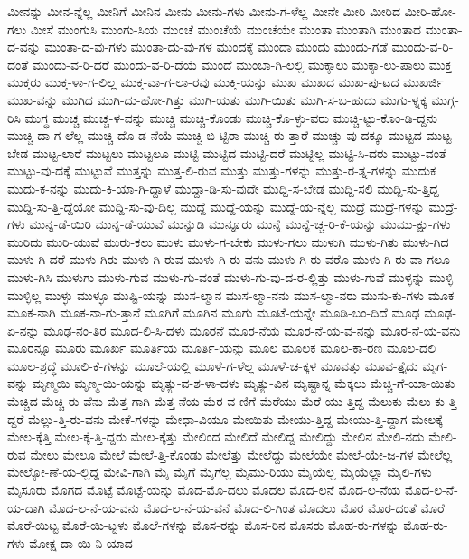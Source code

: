 {ಮೀನನ್ನು
ಮೀನ-ನ್ನೆಲ್ಲ
ಮೀನಿಗೆ
ಮೀನಿನ
ಮೀನು
ಮೀನು-ಗಳು
ಮೀನು-ಗ-ಳೆಲ್ಲ
ಮೀನೇ
ಮೀರಿ
ಮೀರಿದ
ಮೀರಿ-ಹೋ-ಗಲು
ಮೀಸೆ
ಮುಂಗುಸಿ
ಮುಂಗು-ಸಿಯ
ಮುಂಚೆ
ಮುಂಚೆಯೆ
ಮುಂಚೆಯೇ
ಮುಂತಾ
ಮುಂತಾಗಿ
ಮುಂತಾದ
ಮುಂತಾ-ದ-ವನ್ನು
ಮುಂತಾ-ದ-ವು-ಗಳು
ಮುಂತಾ-ದು-ವು-ಗಳ
ಮುಂದಕ್ಕೆ
ಮುಂದಾ
ಮುಂದು
ಮುಂದು-ಗಡೆ
ಮುಂದು-ವ-ರಿ-ದಂತೆ
ಮುಂದು-ವ-ರಿ-ದರೆ
ಮುಂದು-ವ-ರಿ-ದೆಯೆ
ಮುಂದೆ
ಮುಂಬಾ-ಗಿ-ಲಲ್ಲಿ
ಮುಕ್ಕಾಲು
ಮುಕ್ಕಾ-ಲು-ಪಾಲು
ಮುಕ್ತ
ಮುಕ್ತರು
ಮುಕ್ತ-ಳಾ-ಗ-ಲಿಲ್ಲ
ಮುಕ್ತ-ವಾ-ಗ-ಲಾ-ರವು
ಮುಕ್ತಿ-ಯನ್ನು
ಮುಖ
ಮುಖದ
ಮುಖ-ಪು-ಟದ
ಮುಖರ್ಜಿ
ಮುಖ-ವನ್ನು
ಮುಗಿದ
ಮುಗಿ-ದು-ಹೋ-ಗಿತ್ತು
ಮುಗಿ-ಯತು
ಮುಗಿ-ಯಿತು
ಮುಗಿ-ಸ-ಬ-ಹುದು
ಮುಗು-ಳ್ನಕ್ಕ
ಮುಗ್ಗ-ರಿಸಿ
ಮುಗ್ಧ
ಮುಚ್ಚ
ಮುಚ್ಚ-ಳ-ವನ್ನು
ಮುಚ್ಚಿ
ಮುಚ್ಚಿ-ಕೊಂಡು
ಮುಚ್ಚಿ-ಕೊ-ಳ್ಳು-ವರು
ಮುಚ್ಚಿ-ಟ್ಟು-ಕೊಂ-ಡಿ-ದ್ದನು
ಮುಚ್ಚಿ-ದಾ-ಗ-ಲೆಲ್ಲ
ಮುಚ್ಚಿ-ದೊ-ಡ-ನೆಯೆ
ಮುಚ್ಚಿ-ಬಿ-ಟ್ಟಿರಾ
ಮುಚ್ಚಿ-ರು-ತ್ತಾರೆ
ಮುಚ್ಚು-ವು-ದಕ್ಕೂ
ಮುಟ್ಟದ
ಮುಟ್ಟ-ಬೇಡ
ಮುಟ್ಟ-ಲಾರೆ
ಮುಟ್ಟಲು
ಮುಟ್ಟಲೂ
ಮುಟ್ಟಿ
ಮುಟ್ಟಿದ
ಮುಟ್ಟಿ-ದರೆ
ಮುಟ್ಟಿಲ್ಲ
ಮುಟ್ಟಿ-ಸಿ-ದರು
ಮುಟ್ಟು-ವಂತೆ
ಮುಟ್ಟು-ವು-ದಕ್ಕೆ
ಮುಟ್ಟುವೆ
ಮುತ್ತನ್ನು
ಮುತ್ತ-ಲಿ-ರುವ
ಮುತ್ತು
ಮುತ್ತು-ಗಳನ್ನು
ಮುತ್ತು-ರ-ತ್ನ-ಗಳನ್ನು
ಮುದುಕ
ಮುದು-ಕ-ನನ್ನು
ಮುದು-ಕಿ-ಯಾ-ಗಿ-ದ್ದಾಳೆ
ಮುದ್ದಾ-ಡಿ-ಸು-ವುದೇ
ಮುದ್ದಿ-ಸ-ಬೇಡ
ಮುದ್ದಿ-ಸಲಿ
ಮುದ್ದಿ-ಸು-ತ್ತಿದ್ದ
ಮುದ್ದಿ-ಸು-ತ್ತಿ-ದ್ದೆಯೋ
ಮುದ್ದಿ-ಸು-ವು-ದಿಲ್ಲ
ಮುದ್ದೆ
ಮುದ್ದೆ-ಯನ್ನು
ಮುದ್ದೆ-ಯ-ನ್ನೆಲ್ಲ
ಮುದ್ರೆ
ಮುದ್ರೆ-ಗಳನ್ನು
ಮುದ್ರೆ-ಗಳು
ಮುನ್ನ-ಡೆ-ಯಿರಿ
ಮುನ್ನ-ಡೆ-ಯುವೆ
ಮುನ್ನುಡಿ
ಮುನ್ನೂರು
ಮುನ್ನೆ
ಮುನ್ನೆ-ಚ್ಚ-ರಿ-ಕೆ-ಯನ್ನು
ಮುಮು-ಕ್ಷು-ಗಳು
ಮುರಿದು
ಮುರಿ-ಯುವೆ
ಮುರು-ಕಲು
ಮುಳು
ಮುಳು-ಗ-ಬೇಕು
ಮುಳು-ಗಲು
ಮುಳುಗಿ
ಮುಳು-ಗಿತು
ಮುಳು-ಗಿದ
ಮುಳು-ಗಿ-ದರೆ
ಮುಳು-ಗಿರು
ಮುಳು-ಗಿ-ರುವ
ಮುಳು-ಗಿ-ರು-ವನು
ಮುಳು-ಗಿ-ರು-ವರೊ
ಮುಳು-ಗಿ-ರು-ವಾ-ಗಲೂ
ಮುಳು-ಗಿಸಿ
ಮುಳುಗು
ಮುಳು-ಗುವ
ಮುಳು-ಗು-ವಂತೆ
ಮುಳು-ಗು-ವು-ದ-ರ-ಲ್ಲಿತ್ತು
ಮುಳು-ಗುವೆ
ಮುಳ್ಳನ್ನು
ಮುಳ್ಳಿ
ಮುಳ್ಳಿಲ್ಲ
ಮುಳ್ಳು
ಮುಳ್ಳೂ
ಮುಷ್ಟಿ-ಯನ್ನು
ಮುಸ-ಲ್ಮಾನ
ಮುಸ-ಲ್ಮಾ-ನನು
ಮುಸ-ಲ್ಮಾ-ನರು
ಮುಸು-ಕು-ಗಳು
ಮೂಕ
ಮೂಕ-ನಾಗಿ
ಮೂಕ-ನಾ-ಗು-ತ್ತಾನೆ
ಮೂಗಿಗೆ
ಮೂಗಿನ
ಮೂಗು
ಮೂಟೆ-ಯನ್ನೇ
ಮೂಡಿ-ಬಂ-ದಿದೆ
ಮೂಢ
ಮೂಢ-ಏ-ನನ್ನು
ಮೂಢ-ನಂ-ತಿರ
ಮೂದ-ಲಿ-ಸಿ-ದಳು
ಮೂರನೆ
ಮೂರ-ನೆಯ
ಮೂರ-ನೆ-ಯ-ವ-ನನ್ನು
ಮೂರ-ನೆ-ಯ-ವನು
ಮೂರನ್ನೂ
ಮೂರು
ಮೂರ್ಖ
ಮೂರ್ತಿಯ
ಮೂರ್ತಿ-ಯನ್ನು
ಮೂಲ
ಮೂಲಕ
ಮೂಲ-ಕಾ-ರಣ
ಮೂಲ-ದಲಿ
ಮೂಲ-ಶ್ರದ್ಧೆ
ಮೂಲಿ-ಕೆ-ಗಳನ್ನು
ಮೂಲೆ-ಯಲ್ಲಿ
ಮೂಳೆ-ಗ-ಳೆಲ್ಲ
ಮೂಳೆ-ಚ-ಕ್ಕಳ
ಮೂವತ್ತು
ಮೂವ-ತ್ತೈದು
ಮೃಗ-ವನ್ನು
ಮೃಣ್ಮಯಿ
ಮೃಣ್ಮ-ಯಿ-ಯನ್ನು
ಮೃತ್ಯು-ವ-ಶ-ಳಾ-ದಳು
ಮೃತ್ಯು-ವಿನ
ಮೃಷ್ಟಾನ್ನ
ಮೆಕ್ಕಲು
ಮೆಚ್ಚಿ-ಗೆ-ಯಾ-ಯಿತು
ಮೆಚ್ಚಿದ
ಮೆಚ್ಚಿ-ರು-ವೆನು
ಮೆತ್ತ-ಗಾಗಿ
ಮೆತ್ತ-ನೆಯ
ಮೆರ-ವ-ಣಿಗೆ
ಮೆರೆಯು
ಮೆರೆ-ಯು-ತ್ತಿದ್ದ
ಮೆಲುಕು
ಮೆಲು-ಕು-ತ್ತಿ-ದ್ದರೆ
ಮೆಲ್ಲು-ತ್ತಿ-ರು-ವನು
ಮೇಕೆ-ಗಳನ್ನು
ಮೇಧಾ-ವಿಯೂ
ಮೇಯಿತು
ಮೇಯು-ತ್ತಿದ್ದ
ಮೇಯು-ತ್ತಿ-ದ್ದಾಗ
ಮೇಲಕ್ಕೆ
ಮೇಲ-ಕ್ಕೆತ್ತಿ
ಮೇಲ-ಕ್ಕೆ-ತ್ತಿ-ದ್ದರು
ಮೇಲ-ಕ್ಕೆತ್ತು
ಮೇಲಿಂದ
ಮೇಲಿದೆ
ಮೇಲಿದ್ದ
ಮೇಲಿದ್ದು
ಮೇಲಿನ
ಮೇಲಿ-ನದು
ಮೇಲಿ-ರುವ
ಮೇಲು
ಮೇಲೂ
ಮೇಲೆ
ಮೇಲೆ-ತ್ತಿ-ಕೊಂಡು
ಮೇಲೆತ್ತು
ಮೇಲೆದ್ದು
ಮೇಲೆಯೇ
ಮೇಲೆ-ಯೇ-ಜ-ಗಳ
ಮೇಲೆಲ್ಲ
ಮೇಲ್ಕೋ-ಣೆ-ಯ-ಲ್ಲಿದ್ದ
ಮೇವಿ-ಗಾಗಿ
ಮೈ
ಮೈಗೆ
ಮೈಗೆಲ್ಲ
ಮೈಮು-ರಿಯು
ಮೈಯೆಲ್ಲ
ಮೈಯೆಲ್ಲಾ
ಮೈಲಿ-ಗಳು
ಮೈಸೂರು
ಮೊಗದ
ಮೊಟ್ಟೆ
ಮೊಟ್ಟೆ-ಯನ್ನು
ಮೊದ-ಮೊ-ದಲು
ಮೊದಲ
ಮೊದ-ಲನೆ
ಮೊದ-ಲ-ನೆಯ
ಮೊದ-ಲ-ನೆ-ಯ-ದಾಗಿ
ಮೊದ-ಲ-ನೆ-ಯ-ವನು
ಮೊದ-ಲ-ನೆ-ಯ-ವನೆ
ಮೊದ-ಲಿ-ಗಿಂತ
ಮೊದಲು
ಮೊರ
ಮೊರ-ದಂತೆ
ಮೊರೆ
ಮೊರೆ-ಯಿಟ್ಟ
ಮೊರೆ-ಯಿ-ಟ್ಟಳು
ಮೊಲೆ-ಗಳನ್ನು
ಮೊಸ-ರನ್ನು
ಮೊಸ-ರಿನ
ಮೊಸರು
ಮೊಹ-ರು-ಗಳನ್ನು
ಮೊಹ-ರು-ಗಳು
ಮೋಕ್ಷ-ದಾ-ಯಿ-ನಿ-ಯಾದ
}
